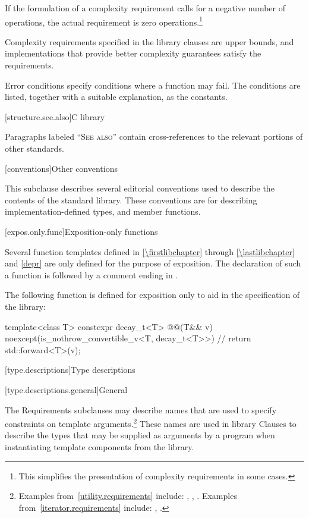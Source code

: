 \pnum
If the formulation of a complexity requirement calls for a negative number of
operations, the actual requirement is zero operations.\footnote{This simplifies
the presentation of complexity requirements in some cases.}

\pnum
Complexity requirements specified in the library clauses are upper bounds,
and implementations that provide better complexity guarantees satisfy
the requirements.

\pnum
Error conditions specify conditions where a function may fail. The conditions
are listed, together with a suitable explanation, as the 
constants.

[structure.see.also]{C library}

\pnum
Paragraphs labeled ``\textsc{See also}'' contain cross-references to the relevant portions
of other standards.

[conventions]{Other conventions}
%

\pnum
This subclause describes several editorial conventions used to describe the contents
of the \Cpp{} standard library.
These conventions are for describing
implementation-defined types,
and member functions.

[expos.only.func]{Exposition-only functions}

\pnum
Several function templates
defined in \ref{\firstlibchapter} through \ref{\lastlibchapter} and \ref{depr}
are only defined for the purpose of exposition.
The declaration of such a function is followed by a comment ending in \expos.

\pnum
The following function is defined for exposition only
to aid in the specification of the library:
\begin{codeblock}
template<class T> constexpr decay_t<T> @@(T&& v)
    noexcept(is_nothrow_convertible_v<T, decay_t<T>>)           // \expos
  { return std::forward<T>(v); }
\end{codeblock}

[type.descriptions]{Type descriptions}

[type.descriptions.general]{General}

\pnum
The Requirements subclauses may describe names that are used to specify
constraints on template arguments.\footnote{Examples
from~\ref{utility.requirements} include:
,
,
.
Examples from~\ref{iterator.requirements} include:
,
.}
These names are used in library Clauses
to describe the types that
may be supplied as arguments by a \Cpp{} program when instantiating template components from
the library.


